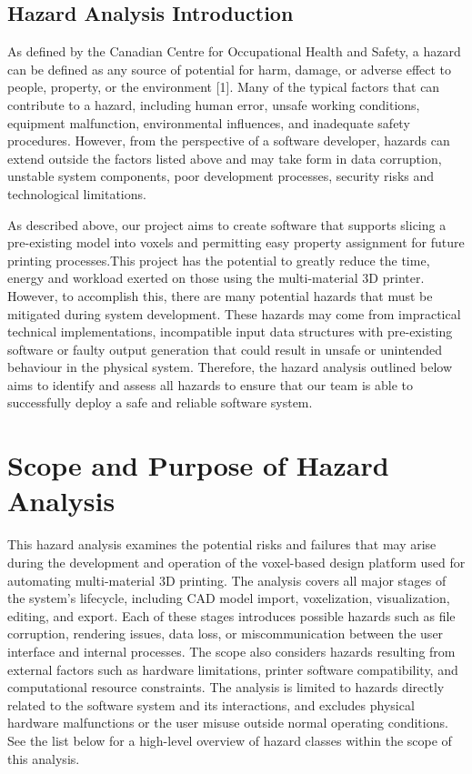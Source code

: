 \documentclass{article}
\begin{document}
\subsection{Hazard Analysis Introduction}

As defined by the Canadian Centre for Occupational Health and Safety, a hazard can be
defined as any source of potential for harm, damage, or adverse effect to people, property,
or the environment [1]. Many of the typical factors that can contribute to a hazard,
including human error, unsafe working conditions, equipment malfunction, environmental
influences, and inadequate safety procedures. However, from the perspective of a software
developer, hazards can extend outside the factors listed above and may take form in data
corruption, unstable system components, poor development processes, security risks and
technological limitations. \par \vspace{1em}

As described above, our project aims to create software that supports slicing a
pre-existing model into voxels and permitting easy property assignment for future
printing processes.This project has the potential to greatly reduce the time, energy
and workload exerted on those using the multi-material 3D printer. However, to accomplish
this, there are many potential hazards that must be mitigated during system development.
These hazards may come from impractical technical implementations, incompatible input data
structures with pre-existing software or faulty output generation that could result in
unsafe or unintended behaviour in the physical system. Therefore, the hazard analysis
outlined below aims to identify and assess all hazards to ensure that our team is able to
successfully deploy a safe and reliable software system.

\section{Scope and Purpose of Hazard Analysis}

\noindent This hazard analysis examines the potential risks and failures that may arise during the development and operation 
of the voxel-based design platform used for automating multi-material 3D printing. The analysis covers all major stages 
of the system’s lifecycle, including CAD model import, voxelization, visualization, editing, and export. Each of these 
stages introduces possible hazards such as file corruption, rendering issues, data loss, or miscommunication between the 
user interface and internal processes. The scope also considers hazards resulting from external factors such as hardware 
limitations, printer software compatibility, and computational resource constraints. The analysis is limited to hazards 
directly related to the software system and its interactions, and excludes physical hardware malfunctions or the user misuse 
outside normal operating conditions. See the list below for a high-level overview of hazard classes within the scope of this analysis.\\
\end{document}
